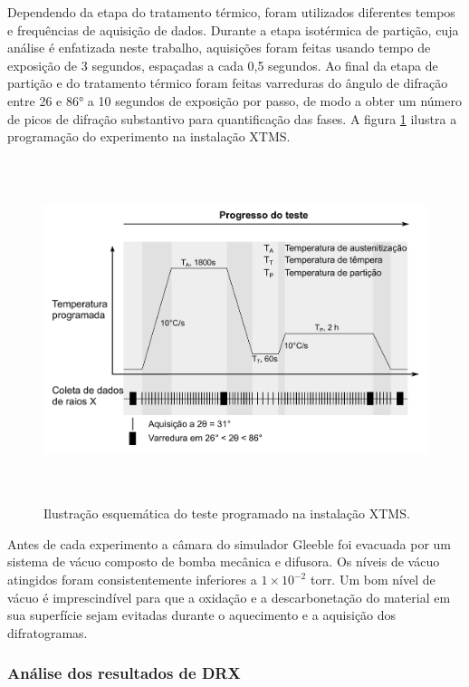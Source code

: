 
Dependendo da etapa do tratamento térmico, foram utilizados diferentes tempos e frequências de aquisição de dados. Durante a etapa isotérmica de partição, cuja análise é enfatizada neste trabalho, aquisições foram feitas usando tempo de exposição de 3 segundos, espaçadas a cada 0,5 segundos. Ao final da etapa de partição e do tratamento térmico foram feitas varreduras do ângulo de difração entre 26 e 86° a 10 segundos de exposição por passo, de modo a obter um número de picos de difração substantivo para quantificação das fases. A figura \ref{fig:esqXTMS} ilustra a programação do experimento na instalação XTMS.

\begin{figure}
	\includegraphics[height=10cm]{img/expproc_XTMS.pdf}
	\caption{Ilustração esquemática do teste programado na instalação XTMS.}
	\label{fig:esqXTMS}
\end{figure}

Antes de cada experimento a câmara do simulador Gleeble foi evacuada por um sistema de vácuo composto de bomba mecânica e difusora. Os níveis de vácuo atingidos foram consistentemente inferiores a $1 \times 10^{-2}$ torr. Um bom nível de vácuo é imprescindível para que a oxidação e a descarbonetação do material em sua superfície sejam evitadas durante o aquecimento e a aquisição dos difratogramas.

\subsubsection{An\'{a}lise dos resultados de DRX}

